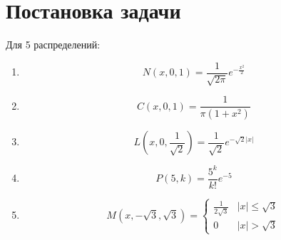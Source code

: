 \documentclass[a4]{article}
\renewcommand{\listoffigures}{\begingroup %
\tocsection
\tocfile{\listfigurename}{lof}
\endgroup}
\renewcommand{\listoftables}{\begingroup %
\tocsection
\tocfile{\listtablename}{lot}
\endgroup}
\begin{document}


\newpage
\tableofcontents{}
\newpage
\listoffigures{}
\listoftables{}
\newpage

\section{Постановка задачи}
Для 5 распределений:
\begin{enumerate}
\item \begin{equation}\label{eqn:normal}
N(x,0,1) = \frac{1}{\sqrt{2\pi}}e^{-\frac{x^2}{2}}
\end{equation} 

\item \begin{equation}\label{eqn:cauchy}
C(x,0,1) = \frac{1}{\pi(1+x^2)}
\end{equation}

\item \begin{equation}\label{eqn:laplace}
L\left( x,0,\frac{1}{\sqrt{2}}\right) = \frac{1}{\sqrt{2}}e^{-\sqrt{2}\vert x\vert}
\end{equation}

\item \begin{equation}\label{eqn:poisson}
P(5,k) = \frac{5^k}{k!}e^{-5}
\end{equation}  

\item \begin{equation}\label{eqn:uniform}
M(x,-\sqrt{3}, \sqrt{3}) = 
\begin{cases}
\frac{1}{2\sqrt{3}} &\vert x\vert \leqslant \sqrt{3}\\
0 &\vert x\vert > \sqrt{3}
\end{cases}
\end{equation}
\end{enumerate}
\end{document}
